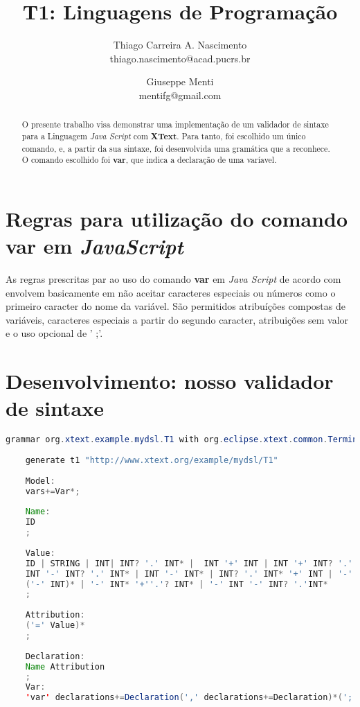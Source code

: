 \documentclass[]{article}
\title{T1: Linguagens de Programação}
\author{Thiago Carreira A. Nascimento \\{thiago.nascimento@acad.pucrs.br} \and Giuseppe Menti \\{mentifg@gmail.com}}
\begin{document}
\maketitle

\begin{abstract}
	
O presente trabalho visa demonstrar uma implementação de um validador de sintaxe para a Linguagem \textit{Java Script} com \textbf{XText}\cite{efftinge_spoenemann}. Para tanto, foi escolhido um único comando, e, a partir da sua sintaxe, foi desenvolvida uma gramática que a reconhece. O comando escolhido foi \textbf{var}\cite{waldron_2018}, que indica a declaração de uma varíavel.

\end{abstract}

\section{Regras para utilização do comando \textbf{var} em \textit{JavaScript}}

As regras prescritas par ao uso do comando \textbf{var} em \textit{Java Script} de acordo com \cite{waldron_2018} envolvem basicamente em não aceitar caracteres especiais ou números como o primeiro caracter do nome da variável. São permitidos atribuíções compostas de variáveis, caracteres especiais a partir do segundo caracter, atribuições sem valor e o uso opcional de ' ;'.
\section{Desenvolvimento: nosso validador de sintaxe}

\begin{lstlisting}[language = java]
	grammar org.xtext.example.mydsl.T1 with org.eclipse.xtext.common.Terminals
	
	generate t1 "http://www.xtext.org/example/mydsl/T1"
	
	Model:
	vars+=Var*;
	
	Name:
	ID
	;
	
	Value:
	ID | STRING | INT| INT? '.' INT* |  INT '+' INT | INT '+' INT? '.' INT* | INT '+' INT* | INT '-' INT |
	INT '-' INT? '.' INT* | INT '-' INT* | INT? '.' INT* '+' INT | '-' INT* | 
	('-' INT)* | '-' INT* '+''.'? INT* | '-' INT '-' INT? '.'INT*
	;
	
	Attribution:
	('=' Value)*
	;
	
	Declaration:
	Name Attribution
	;
	Var:
	'var' declarations+=Declaration(',' declarations+=Declaration)*(';')?;
	
	\end{lstlisting}
\end{document}
